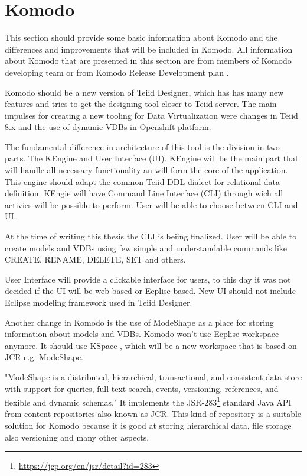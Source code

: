 \documentclass[12pt,oneside]{fithesis2}
\begin{document}
\section{Komodo}
\par This section should provide some basic information about Komodo and the differences and improvements that will be included in Komodo. All information about Komodo that are presented in this section are from members of Komodo developing team or from Komodo Release Development plan \cite{Komodo}. 
\par Komodo should be a new version of Teiid Designer, which has has many new features and tries to get the designing tool closer to Teiid server. The main impulses for creating a new tooling for Data Virtualization were changes in Teiid 8.x and the use of dynamic VDBs in Openshift platform.  
\par The fundamental difference in architecture of this tool is the division in two parts. The KEngine and User Interface (UI). KEngine will be the main part that will handle all necessary functionality an will form the core of the application. This engine should adapt the common Teiid DDL dialect for relational data definition. KEngie will have Command Line Interface (CLI) through wich all activies will be possible to perform. User will be able to choose between CLI and UI.
\par At the time of writing this thesis the CLI is beiing finalized. User will be able to create models and VDBs using few simple and understandable commands like CREATE, RENAME, DELETE, SET and others.
\par User Interface will provide a clickable interface for users, to this day it was not decided if the UI will be web-based or Ecplise-based. New UI should not include Eclipse modeling framework used in Teiid Designer.
\par Another change in Komodo is the use of ModeShape as a place for storing information about models and VDBs. Komodo won't use Ecplise workspace anymore. It should use KSpace , which will be a new workspace that is based on JCR e.g. ModeShape. 
\par "ModeShape is a distributed, hierarchical, transactional, and consistent data store with support for queries, full-text search, events, versioning, references, and flexible and dynamic schemas."\cite{ModeShape} It implements the JSR-283\footnote{\url{https://jcp.org/en/jsr/detail?id=283}} standard Java API from content repositories also known as JCR. This kind of repository is a suitable solution for Komodo because it is good at storing hierarchical data, file storage also versioning and many other aspects. 
\end{document}
